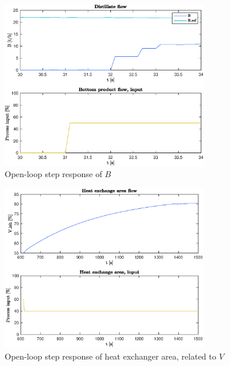 \documentclass[12pt]{article}
\begin{document}
\begin{figure}[p]
\centering
\includegraphics[width=0.8\textwidth]{../Systemanalyse/Log_Data_to_Matlab/Figurer/Stegeksperimenter/FC1019.eps}
\caption{Open-loop step response of $B$}
\label{fig:ol_step_FC1019}
\end{figure}

\begin{figure}[p]
\centering
\includegraphics[width=0.8\textwidth]{../Systemanalyse/Log_Data_to_Matlab/Figurer/Stegeksperimenter/LC1028.eps}
\caption{Open-loop step response of heat exchanger area, related to $V$}
\label{fig:ol_step_LC1028}
\end{figure}
\end{document}

